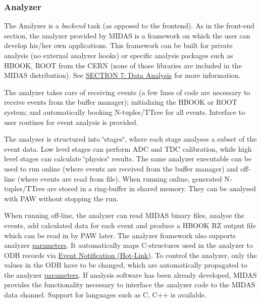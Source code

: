 \label{F_MainElements_idx_analyzer_overview}
\hypertarget{F_MainElements_idx_analyzer_overview}{}
 \hypertarget{F_MainElements_F_Analyzer_sec_overview}{}\subsubsection{Analyzer}\label{F_MainElements_F_Analyzer_sec_overview}
The Analyzer is a {\itshape backend\/} task (as opposed to the frontend). As in the front-\/end section, the analyzer provided by MIDAS is a framework on which the user can develop his/her own applications. This framework can be built for private analysis (no external analyzer hooks) or specific analysis packages such as HBOOK, ROOT from the CERN (none of those libraries are included in the MIDAS distribution). See \hyperlink{DataAnalysis}{SECTION 7: Data Analysis} for more information.

The analyzer takes care of receiving events (a few lines of code are necessary to receive events from the buffer manager); initializing the HBOOK or ROOT system; and automatically booking N-\/tuples/TTree for all events. Interface to user routines for event analysis is provided.

The analyzer is structured into \char`\"{}stages\char`\"{}, where each stage analyses a subset of the event data. Low level stages can perform ADC and TDC calibration, while high level stages can calculate \char`\"{}physics\char`\"{} results. The same analyzer executable can be used to run online (where events are received from the buffer manager) and off-\/line (where events are read from file). When running online, generated N-\/tuples/TTree are stored in a ring-\/buffer in shared memory. They can be analysed with PAW without stopping the run.

When running off-\/line, the analyzer can read MIDAS binary files, analyse the events, add calculated data for each event and produce a HBOOK RZ output file which can be read in by PAW later. The analyzer framework also supports analyzer \hyperlink{structparameters}{parameters}. It automatically maps C-\/structures used in the analyzer to ODB records via \hyperlink{RC_Hot_Link}{Event Notification (Hot-\/Link)}. To control the analyzer, only the values in the ODB have to be changed, which are automatically propagated to the analyzer \hyperlink{structparameters}{parameters}. If analysis software has been already developed, MIDAS provides the functionality necessary to interface the analyzer code to the MIDAS data channel. Support for languages such as C, C++ is available.

